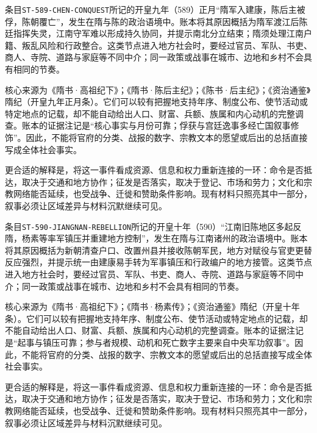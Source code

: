 
条目\texttt{ST-589-CHEN-CONQUEST}所记的开皇九年（589）正月“隋军入建康，陈后主被俘，陈朝覆亡”，发生在隋与陈的政治语境中。账本将其原因概括为隋军渡江后陈廷指挥失灵，江南守军难以形成持久协同，并提示南北分立结束；隋须处理江南户籍、叛乱风险和行政整合。这类节点进入地方社会时，要经过官员、军队、书吏、商人、寺院、道路与家庭等不同中介；同一政策或战事在城市、边地和乡村不会具有相同的节奏。

核心来源为《隋书·高祖纪下》；《隋书·陈后主纪》；《陈书·后主纪》；《资治通鉴》隋纪（开皇九年正月条）。它们可以较有把握地支持年序、制度公布、使节活动或特定地点的记载，却不能自动给出人口、财富、兵额、族属和内心动机的完整调查。账本的证据注记是“核心事实与月份可靠；俘获与宫廷逸事多经亡国叙事修饰”。因此，不能将官府的分类、战报的数字、宗教文本的愿望或后出的总括直接写成全体社会事实。

更合适的解释是，将这一事件看成资源、信息和权力重新连接的一环：命令是否抵达，取决于交通和地方协作；征发是否落实，取决于登记、市场和劳力；文化和宗教网络能否延续，也受战争、迁徙和赞助条件影响。现有材料只照亮其中一部分，叙事必须让区域差异与材料沉默继续可见。


条目\texttt{ST-590-JIANGNAN-REBELLION}所记的开皇十年（590）“江南旧陈地区多起反隋，杨素等率军镇压并重建地方控制”，发生在隋与江南诸州的政治语境中。账本将其原因概括为新朝清查户口、改置州县并接收陈朝军民，地方对赋役与官吏更替反应强烈，并提示统一由建康易手转为军事镇压和行政编户的地方接管。这类节点进入地方社会时，要经过官员、军队、书吏、商人、寺院、道路与家庭等不同中介；同一政策或战事在城市、边地和乡村不会具有相同的节奏。

核心来源为《隋书·高祖纪下》；《隋书·杨素传》；《资治通鉴》隋纪（开皇十年条）。它们可以较有把握地支持年序、制度公布、使节活动或特定地点的记载，却不能自动给出人口、财富、兵额、族属和内心动机的完整调查。账本的证据注记是“起事与镇压可靠；参与者规模、动机和死亡数字主要来自中央军功叙事”。因此，不能将官府的分类、战报的数字、宗教文本的愿望或后出的总括直接写成全体社会事实。

更合适的解释是，将这一事件看成资源、信息和权力重新连接的一环：命令是否抵达，取决于交通和地方协作；征发是否落实，取决于登记、市场和劳力；文化和宗教网络能否延续，也受战争、迁徙和赞助条件影响。现有材料只照亮其中一部分，叙事必须让区域差异与材料沉默继续可见。


